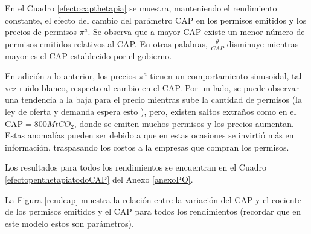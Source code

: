 En el Cuadro \ref{efectocapthetapia} se muestra, manteniendo el rendimiento constante, el efecto del cambio del parámetro CAP en los permisos emitidos y los precios de permisos $\pi^a$.  Se observa que a mayor CAP existe un menor número de permisos emitidos relativos al CAP. En otras palabras, $\frac{\theta}{CAP}$ disminuye mientras mayor es el CAP establecido por el gobierno.
\vspace{2.5mm}

En adición a lo anterior, los precios $\pi^a$ tienen un comportamiento sinusoidal, tal vez ruido blanco, respecto al cambio en el CAP. Por un lado, se puede observar una tendencia a la baja para el precio mientras sube la cantidad de permisos (la ley de oferta y demanda espera esto ), pero, existen saltos extraños como en el CAP$=800MtCO_2$, donde se emiten muchos permisos y los precios aumentan. Estas anomalías pueden ser debido a que en estas ocasiones se invirtió más en información, traspasando los costos a la empresas que compran los permisos.
\vspace{2.5mm}

Los resultados para todos los rendimientos se encuentran en el Cuadro \ref{efectopenthetapiatodoCAP} del Anexo \ref{anexoPO}.
\vspace{2.5mm}

La Figura \ref{rendcap} muestra la relación entre la variación del CAP y el cociente de los permisos emitidos y el CAP para todos los rendimientos (recordar que en este modelo estos son parámetros).
\vspace{2.5mm}

